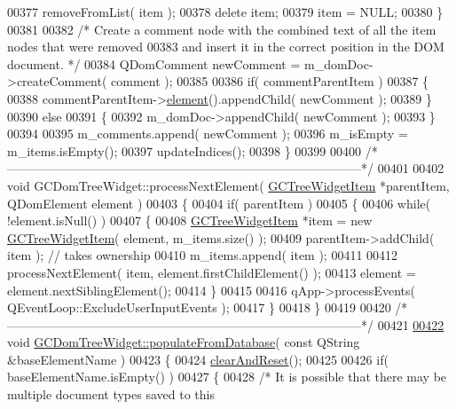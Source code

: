\begin{DoxyCode}
00377     removeFromList( item );
00378     \textcolor{keyword}{delete} item;
00379     item = NULL;
00380   \}
00381 
00382   \textcolor{comment}{/* Create a comment node with the combined text of all the item nodes that
       were removed}
00383 \textcolor{comment}{    and insert it in the correct position in the DOM document. */}
00384   QDomComment newComment = m\_domDoc->createComment( comment );
00385 
00386   \textcolor{keywordflow}{if}( commentParentItem )
00387   \{
00388     commentParentItem->\hyperlink{class_g_c_tree_widget_item_a584cad866bdbd94710d31eb77b804d84}{element}().appendChild( newComment );
00389   \}
00390   \textcolor{keywordflow}{else}
00391   \{
00392     m\_domDoc->appendChild( newComment );
00393   \}
00394 
00395   m\_comments.append( newComment );
00396   m\_isEmpty = m\_items.isEmpty();
00397   updateIndices();
00398 \}
00399 
00400 \textcolor{comment}{/*
      --------------------------------------------------------------------------------------*/}
00401 
00402 \textcolor{keywordtype}{void} GCDomTreeWidget::processNextElement( \hyperlink{class_g_c_tree_widget_item}{GCTreeWidgetItem} *parentItem, 
      QDomElement element )
00403 \{
00404   \textcolor{keywordflow}{if}( parentItem )
00405   \{
00406     \textcolor{keywordflow}{while}( !element.isNull() )
00407     \{
00408       \hyperlink{class_g_c_tree_widget_item}{GCTreeWidgetItem} *item = \textcolor{keyword}{new} \hyperlink{class_g_c_tree_widget_item}{GCTreeWidgetItem}( element, m\_items.size() );
00409       parentItem->addChild( item );  \textcolor{comment}{// takes ownership}
00410       m\_items.append( item );
00411 
00412       processNextElement( item, element.firstChildElement() );
00413       element = element.nextSiblingElement();
00414     \}
00415 
00416     qApp->processEvents( QEventLoop::ExcludeUserInputEvents );
00417   \}
00418 \}
00419 
00420 \textcolor{comment}{/*
      --------------------------------------------------------------------------------------*/}
00421 
\hypertarget{gcdomtreewidget_8cpp_source_l00422}{}\hyperlink{class_g_c_dom_tree_widget_a06ee56d0aa9348302dbb8d3f4e5bab44}{00422} \textcolor{keywordtype}{void} \hyperlink{class_g_c_dom_tree_widget_a06ee56d0aa9348302dbb8d3f4e5bab44}{GCDomTreeWidget::populateFromDatabase}( \textcolor{keyword}{const} QString &baseElementName )
00423 \{
00424   \hyperlink{class_g_c_dom_tree_widget_a3716c84a2a4fadc653cfac157caa215d}{clearAndReset}();
00425 
00426   \textcolor{keywordflow}{if}( baseElementName.isEmpty() )
00427   \{
00428     \textcolor{comment}{/* It is possible that there may be multiple document types saved to this
}
\end{DoxyCode}
